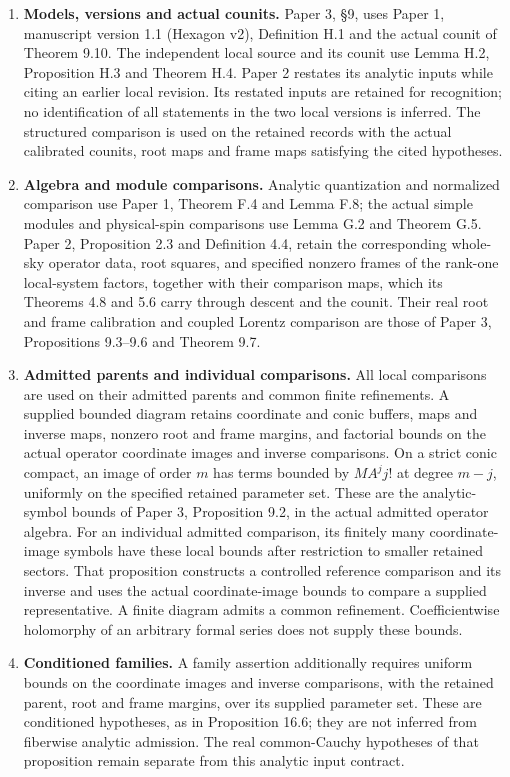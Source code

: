 \documentclass[
  english,
  11pt,
  reqno]{amsart}
\providecommand{\tightlist}{%
  \setlength{\itemsep}{0pt}\setlength{\parskip}{0pt}}
\begin{document}
\begin{enumerate}
\tightlist
\item
  \textbf{Models, versions and actual counits.} Paper 3, §9, uses Paper
  1, manuscript version 1.1 (Hexagon v2), Definition H.1 and the actual
  counit of Theorem 9.10. The independent local source and its counit
  use Lemma H.2, Proposition H.3 and Theorem H.4. Paper 2 restates its
  analytic inputs while citing an earlier local revision. Its restated
  inputs are retained for recognition; no identification of all
  statements in the two local versions is inferred. The structured
  comparison is used on the retained records with the actual calibrated
  counits, root maps and frame maps satisfying the cited hypotheses.
\item
  \textbf{Algebra and module comparisons.} Analytic quantization and
  normalized comparison use Paper 1, Theorem F.4 and Lemma F.8; the
  actual simple modules and physical-spin comparisons use Lemma G.2 and
  Theorem G.5. Paper 2, Proposition 2.3 and Definition 4.4, retain the
  corresponding whole-sky operator data, root squares, and specified
  nonzero frames of the rank-one local-system factors, together with
  their comparison maps, which its Theorems 4.8 and 5.6 carry through
  descent and the counit. Their real root and frame calibration and
  coupled Lorentz comparison are those of Paper 3, Propositions 9.3--9.6
  and Theorem 9.7.
\item
  \textbf{Admitted parents and individual comparisons.} All local
  comparisons are used on their admitted parents and common finite
  refinements. A supplied bounded diagram retains coordinate and conic
  buffers, maps and inverse maps, nonzero root and frame margins, and
  factorial bounds on the actual operator coordinate images and inverse
  comparisons. On a strict conic compact, an image of order \(m\) has
  terms bounded by \(M A^j j!\) at degree \(m-j\), uniformly on the
  specified retained parameter set. These are the analytic-symbol bounds
  of Paper 3, Proposition 9.2, in the actual admitted operator algebra.
  For an individual admitted comparison, its finitely many
  coordinate-image symbols have these local bounds after restriction to
  smaller retained sectors. That proposition constructs a controlled
  reference comparison and its inverse and uses the actual
  coordinate-image bounds to compare a supplied representative. A finite
  diagram admits a common refinement. Coefficientwise holomorphy of an
  arbitrary formal series does not supply these bounds.
\item
  \textbf{Conditioned families.} A family assertion additionally
  requires uniform bounds on the coordinate images and inverse
  comparisons, with the retained parent, root and frame margins, over
  its supplied parameter set. These are conditioned hypotheses, as in
  Proposition 16.6; they are not inferred from fiberwise analytic
  admission. The real common-Cauchy hypotheses of that proposition
  remain separate from this analytic input contract.
\end{enumerate}
\end{document}
